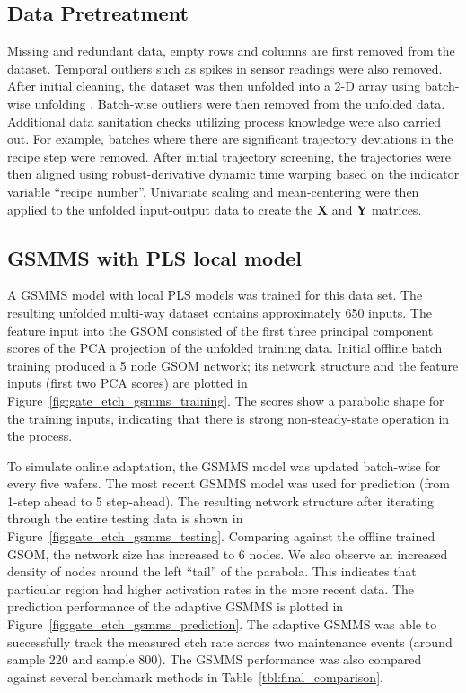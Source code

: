 \subsection{Data Pretreatment}
Missing and redundant data, empty rows and columns are first removed from the dataset. 
Temporal outliers such as spikes in sensor readings were also removed.
After initial cleaning, the dataset was then unfolded into a 2-D array using
batch-wise unfolding \cite{Westerhuis1999}. Batch-wise outliers were then removed from the unfolded data. Additional data sanitation checks utilizing process knowledge were also carried out. For example, batches where there are significant trajectory deviations in the recipe step were removed. After initial trajectory screening, the trajectories were then aligned using
robust-derivative dynamic time warping \cite{Zhang2013} based on the
indicator variable ``recipe number''. Univariate scaling and mean-centering
were then applied to the unfolded input-output data to create the
$\mathbf{X}$ and $\mathbf Y$ matrices.


\subsection{GSMMS with PLS local model}
A GSMMS model with local PLS models was trained for this data
set. The resulting unfolded multi-way dataset contains approximately 650
inputs. 
The feature input into the GSOM consisted of the first three principal component scores of the PCA projection of the unfolded training data. 
Initial offline batch training produced a 5 node GSOM network; its network structure and the feature inputs (first two PCA scores) are plotted in Figure~\ref{fig:gate_etch_gsmms_training}.
The scores show a parabolic shape for the training inputs, indicating that there is strong non-steady-state operation in the process. 

To simulate online adaptation, the GSMMS model was updated batch-wise for every five wafers. The most recent GSMMS model was used for prediction (from 1-step ahead to 5 step-ahead). The resulting network structure after iterating through the entire testing data is shown in
Figure~\ref{fig:gate_etch_gsmms_testing}. Comparing against the offline trained GSOM, the network size has increased to 6 nodes. We also observe an increased density of nodes around the left
``tail'' of the parabola. This indicates that particular region had higher activation rates in the more recent data. The prediction performance of the adaptive GSMMS is plotted in
Figure~\ref{fig:gate_etch_gsmms_prediction}. The adaptive GSMMS was able to successfully track the measured etch rate across two maintenance events (around sample 220 and sample 800). The GSMMS performance was also compared against several benchmark methods in Table~\ref{tbl:final_comparison}.



